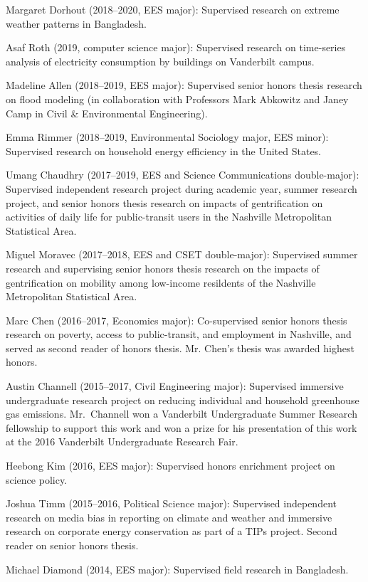\item Margaret Dorhout (2018--2020, EES major): Supervised research on extreme weather patterns in Bangladesh.
\item Asaf Roth (2019, computer science major): Supervised research on time-series analysis of electricity consumption by buildings on Vanderbilt campus.
\item Madeline Allen (2018--2019, EES major): Supervised senior honors thesis research on flood modeling (in collaboration with Professors Mark Abkowitz and Janey Camp in Civil \& Environmental Engineering).
\item Emma Rimmer (2018--2019, Environmental Sociology major, EES minor): Supervised research on household energy efficiency in the United States.
\item Umang Chaudhry (2017--2019, EES and Science Communications double-major): Supervised independent research project during academic year, summer research project, and senior honors thesis research on impacts of gentrification on activities of daily life
for public-transit users in the Nashville Metropolitan Statistical Area.
\item Miguel Moravec (2017--2018, EES and CSET double-major): Supervised summer research and supervising senior honors thesis research on the impacts of gentrification on mobility among low-income resildents of the Nashville Metropolitan Statistical Area.
\item Marc Chen (2016--2017, Economics major): Co-supervised senior honors thesis research on poverty, access to public-transit, and employment in Nashville, and served as second reader of honors thesis. Mr. Chen's thesis was awarded highest honors.
\item Austin Channell (2015--2017, Civil Engineering major): Supervised immersive undergraduate research project on reducing individual and household greenhouse gas emissions.
Mr.~Channell won a Vanderbilt Undergraduate Summer Research fellowship to support this work and won a prize for his presentation of this work at the 2016 Vanderbilt Undergraduate Research Fair.
\item Heebong Kim (2016, EES major): Supervised honors enrichment project on science policy.
\item Joshua Timm (2015--2016, Political Science major): Supervised independent research on media bias in reporting on climate and weather and immersive research on corporate energy conservation as part of a TIPs project. Second reader on senior honors thesis.
\item Michael Diamond (2014, EES major): Supervised field research in Bangladesh.
